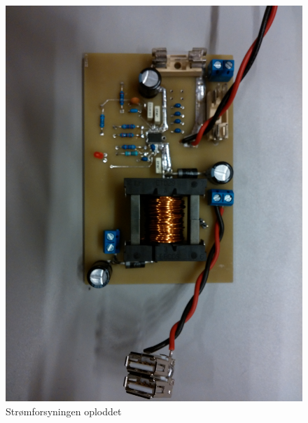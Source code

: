 \begin{figure}[h]
\centering
\includegraphics[angle=90, width=\textwidth- 5cm]{../fig/billeder/impl_psu/psu_pcb}
\caption{Strømforsyningen oploddet}
\label{fig:bil_psu_img}
\end{figure}

